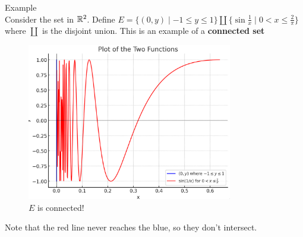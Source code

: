 \documentclass[a4paper]{article}
\begin{document}
\begin{note}{Example}\\
  Consider the set in $\mathbb{R}^{2}$. Define $E = \{\left( 0,y \right) \mid -1 \leq y \leq 1 \} \coprod \{\sin \frac{1}{x} \mid  0 < x \leq \frac{2}{\pi}\}$ where $\coprod$ is the disjoint union. This is an example of a \textbf{connected set}

\begin{figure}[H]
  \centering
  \includegraphics[width=0.8\textwidth]{assets/connected_set_example.png}
  \caption{$E$ is connected!}
  \label{fig:connected_set_example}
\end{figure}
Note that the red line never reaches the blue, so they don't intersect. \\
\end{note} 
\end{document}
